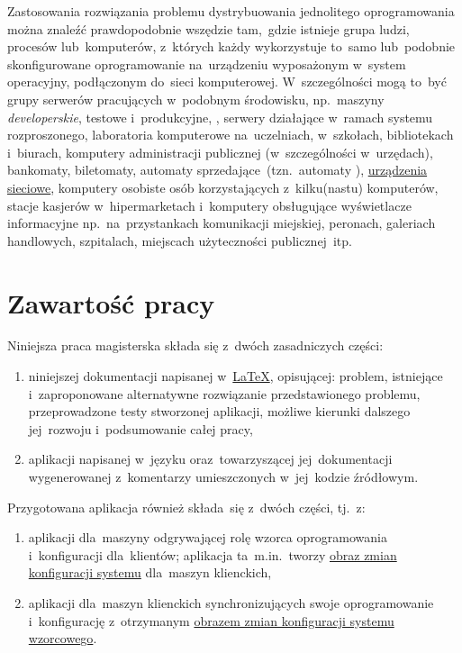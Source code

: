 \documentclass[thesis]{subfiles}
\begin{document}
Zastosowania rozwiązania problemu dystrybuowania jednolitego oprogramowania można znaleźć prawdopodobnie wszędzie tam,~gdzie istnieje grupa ludzi, procesów lub~komputerów, z~których każdy wykorzystuje to~samo lub~podobnie skonfigurowane oprogramowanie na~urządzeniu wyposażonym w~system operacyjny, podłączonym do~sieci komputerowej. W~szczególności mogą to~być grupy serwerów pracujących w~podobnym środowisku, np.~maszyny \emph{developerskie}, testowe i~produkcyjne, , serwery działające w~ramach systemu rozproszonego, laboratoria komputerowe na~uczelniach, w~szkołach, bibliotekach i~biurach, komputery administracji publicznej (w~szczególności w~urzędach), bankomaty, biletomaty, automaty sprzedające~(tzn.~automaty ), \href{https://en.wikipedia.org/wiki/Networking_hardware}{urządzenia sieciowe}, komputery osobiste osób korzystających z~kilku(nastu) komputerów, stacje kasjerów w~hipermarketach i~komputery obsługujące wyświetlacze informacyjne np.~na~przystankach komunikacji miejskiej, peronach, galeriach handlowych, szpitalach, miejscach użyteczności publicznej~itp.


\section{Zawartość pracy}

\noindent Niniejsza praca magisterska składa się z~dwóch zasadniczych części:\mynobreakpar
\begin{enumerate}
	\item niniejszej dokumentacji napisanej w~\href{https://en.wikipedia.org/wiki/LaTeX}{\LaTeX}, opisującej: problem, istniejące i~zaproponowane alternatywne rozwiązanie przedstawionego problemu, przeprowadzone testy stworzonej aplikacji, możliwe kierunki dalszego jej~rozwoju i~podsumowanie całej pracy,
	\item aplikacji napisanej w~języku \python{} oraz~towarzyszącej jej~dokumentacji wygenerowanej z~komentarzy umieszczonych w~jej~kodzie źródłowym.
\end{enumerate}
Przygotowana aplikacja również składa~się z~dwóch części, tj.~z:\mynobreakpar%
\begin{enumerate}
	\item aplikacji dla~maszyny odgrywającej rolę wzorca oprogramowania i~konfiguracji dla~klientów; aplikacja ta~m.in.~tworzy \hyperref[sec:obraz-zmian-konfiguracji]{obraz zmian konfiguracji systemu} dla~maszyn klienckich,
	\item aplikacji dla~maszyn klienckich synchronizujących swoje oprogramowanie i~konfigurację z~otrzymanym \hyperref[sec:obraz-zmian-konfiguracji]{obrazem zmian konfiguracji systemu wzorcowego}.
\end{enumerate}
\end{document}
